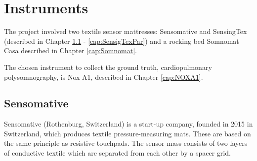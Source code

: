 \section{Instruments}
The project involved two textile sensor mattresses: Sensomative and SensingTex (described in Chapter \ref{cap:SensomativePar} - \ref{cap:SensigTexPar}) and a rocking bed Somnomat Casa described in Chapter \ref{cap:Somnomat}.

The chosen instrument to collect the ground truth, cardiopulmonary polysomnography, is Nox A1, described in Chapter \ref{cap:NOXA1}.


\subsection{Sensomative}\label{cap:SensomativePar}
Sensomative (Rothenburg, Switzerland)\cite{sensomativeUrl} is a start-up company, founded in 2015 in Switzerland, which produces textile pressure-measuring mats. These are based on the same principle as resistive touchpads. The sensor mass
consists of two layers of conductive textile which are separated from each other by a spacer grid. 

